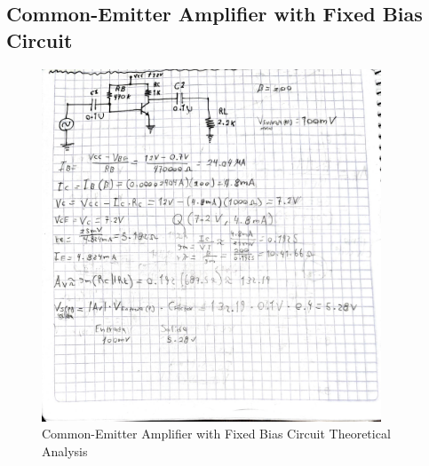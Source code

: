\subsection{Common-Emitter Amplifier with Fixed Bias Circuit}

\begin{figure}[h]
    \centering
    \includegraphics[width = 0.9\textwidth]{Imagenes/Imagenes_Juan/AnalisisTeorico_Circuito1.jpg}
    \caption{Common-Emitter Amplifier with Fixed Bias Circuit Theoretical Analysis}
    \label{circuit1Teorico}
\end{figure}